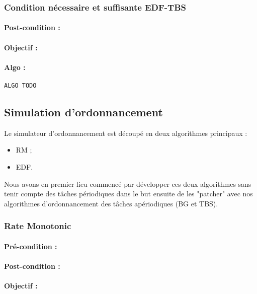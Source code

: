			\subsubsection{Condition nécessaire et suffisante EDF-TBS}
				\paragraph{Post-condition :} 
				\paragraph{Objectif :} 
				\paragraph{Algo :} 
					\begin{lstlisting}
ALGO TODO
					\end{lstlisting}
	
		\subsection{Simulation d'ordonnancement}
			Le simulateur d'ordonnancement est découpé en deux algorithmes principaux :
			\begin{itemize}
				\item RM ;
				\item EDF.
			\end{itemize}
			
			Nous avons en premier lieu commencé par développer ces deux algorithmes sans tenir compte des tâches périodiques dans le but ensuite de les "patcher" avec nos algorithmes d'ordonnancement des tâches apériodiques (BG et TBS).
			
			\subsubsection{Rate Monotonic}
				\paragraph{Pré-condition :} 
				\paragraph{Post-condition :} 
				\paragraph{Objectif :} 

